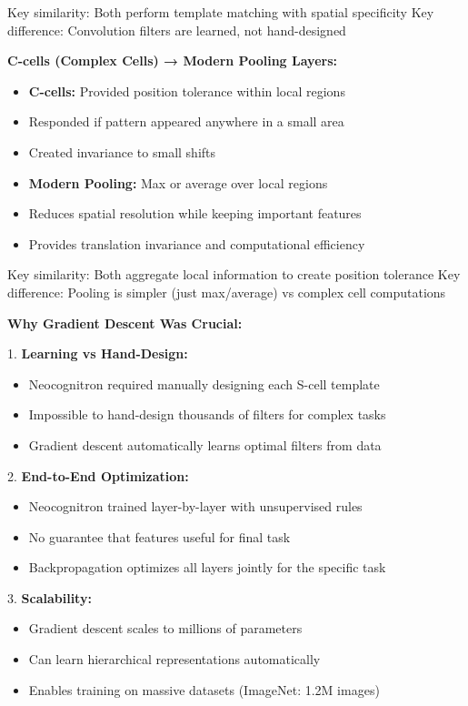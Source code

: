 \documentclass[12pt]{article}
\newcommand{\explanation}[1]{{\color{explanationcolor}#1}}
\begin{document}
\begin{enumerate}[(a)]
{{    Key similarity: Both perform template matching with spatial specificity
    Key difference: Convolution filters are learned, not hand-designed
    }
    
    \textbf{C-cells (Complex Cells) → Modern Pooling Layers:}
    \explanation{
    \begin{itemize}
        \item \textbf{C-cells:} Provided position tolerance within local regions
        \item Responded if pattern appeared anywhere in a small area
        \item Created invariance to small shifts
        \item \textbf{Modern Pooling:} Max or average over local regions
        \item Reduces spatial resolution while keeping important features
        \item Provides translation invariance and computational efficiency
    \end{itemize}
    
    Key similarity: Both aggregate local information to create position tolerance
    Key difference: Pooling is simpler (just max/average) vs complex cell computations
    }
    
    \textbf{Why Gradient Descent Was Crucial:}
    
    \explanation{
    1. \textbf{Learning vs Hand-Design:}
    \begin{itemize}
        \item Neocognitron required manually designing each S-cell template
        \item Impossible to hand-design thousands of filters for complex tasks
        \item Gradient descent automatically learns optimal filters from data
    \end{itemize}
    
    2. \textbf{End-to-End Optimization:}
    \begin{itemize}
        \item Neocognitron trained layer-by-layer with unsupervised rules
        \item No guarantee that features useful for final task
        \item Backpropagation optimizes all layers jointly for the specific task
    \end{itemize}
    
    3. \textbf{Scalability:}
    \begin{itemize}
        \item Gradient descent scales to millions of parameters
        \item Can learn hierarchical representations automatically
        \item Enables training on massive datasets (ImageNet: 1.2M images)
    \end{itemize}
    
}}
\end{enumerate}
\end{document}
